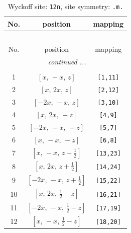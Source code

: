 \documentclass[fleqn,8pt]{jsarticle}
\begin{document}
\begin{longtable}{ccc}
\caption{Wyckoff site: {\tt 12n}, site symmetry: {\tt .m.}}
 \\
 \hline \hline
No. & position & mapping \\ \hline \endfirsthead

\multicolumn{2}{l}{\tablename\ \thetable{}} \\
 \hline \hline
No. & position & mapping \\ \hline \endhead

 \hline \hline
\multicolumn{2}{r}{\footnotesize\it continued ...} \\ \endfoot

 \hline \hline
\multicolumn{2}{r}{} \\ \endlastfoot

1 & $\left[ x,\, - x,\, z \right]$ & {\tt [1,11]} \\ \hline
2 & $\left[ x,\, 2 x,\, z \right]$ & {\tt [2,12]} \\ \hline
3 & $\left[ - 2 x,\, - x,\, z \right]$ & {\tt [3,10]} \\ \hline
4 & $\left[ x,\, 2 x,\, - z \right]$ & {\tt [4,9]} \\ \hline
5 & $\left[ - 2 x,\, - x,\, - z \right]$ & {\tt [5,7]} \\ \hline
6 & $\left[ x,\, - x,\, - z \right]$ & {\tt [6,8]} \\ \hline
7 & $\left[ x,\, - x,\, z + \frac{1}{2} \right]$ & {\tt [13,23]} \\ \hline
8 & $\left[ x,\, 2 x,\, z + \frac{1}{2} \right]$ & {\tt [14,24]} \\ \hline
9 & $\left[ - 2 x,\, - x,\, z + \frac{1}{2} \right]$ & {\tt [15,22]} \\ \hline
10 & $\left[ x,\, 2 x,\, \frac{1}{2} - z \right]$ & {\tt [16,21]} \\ \hline
11 & $\left[ - 2 x,\, - x,\, \frac{1}{2} - z \right]$ & {\tt [17,19]} \\ \hline
12 & $\left[ x,\, - x,\, \frac{1}{2} - z \right]$ & {\tt [18,20]} \\
\end{longtable}
\renewcommand{\arraystretch}{1.2}
\end{document}
